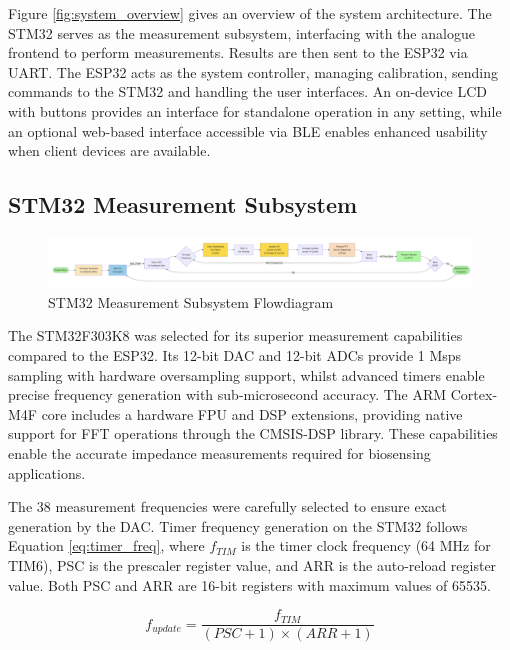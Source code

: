 Figure \ref{fig:system_overview} gives an overview of the system architecture. The STM32 serves as the measurement subsystem, interfacing with the analogue frontend to perform measurements. Results are then sent to the ESP32 via UART. The ESP32 acts as the system controller, managing calibration, sending commands to the STM32 and handling the user interfaces. An on-device LCD with buttons provides an interface for standalone operation in any setting, while an optional web-based interface accessible via \ac{BLE} enables enhanced usability when client devices are available.

\subsection{STM32 Measurement Subsystem}
\begin{figure}[H]
    \centering
    \includegraphics[width=\textwidth]{STMFlowDiagram.png}
    \caption{STM32 Measurement Subsystem Flowdiagram}
    \label{fig:stm32_flow}
\end{figure}
The STM32F303K8 was selected for its superior measurement capabilities compared to the ESP32. Its 12-bit \ac{DAC} and 12-bit \acp{ADC} provide 1 Msps sampling with hardware oversampling support, whilst advanced timers enable precise frequency generation with sub-microsecond accuracy. The ARM Cortex-M4F core includes a hardware \ac{FPU} and \ac{DSP} extensions, providing native support for \ac{FFT} operations through the CMSIS-DSP library. These capabilities enable the accurate impedance measurements required for biosensing applications.

The 38 measurement frequencies were carefully selected to ensure exact generation by the \ac{DAC}. Timer frequency generation on the STM32 follows Equation \ref{eq:timer_freq}, where $f_{TIM}$ is the timer clock frequency (64 MHz for TIM6), PSC is the prescaler register value, and ARR is the auto-reload register value. Both PSC and ARR are 16-bit registers with maximum values of 65535.

\begin{equation}
    f_{update} = \frac{f_{TIM}}{(PSC + 1) \times (ARR + 1)}
    \label{eq:timer_freq}
\end{equation}

